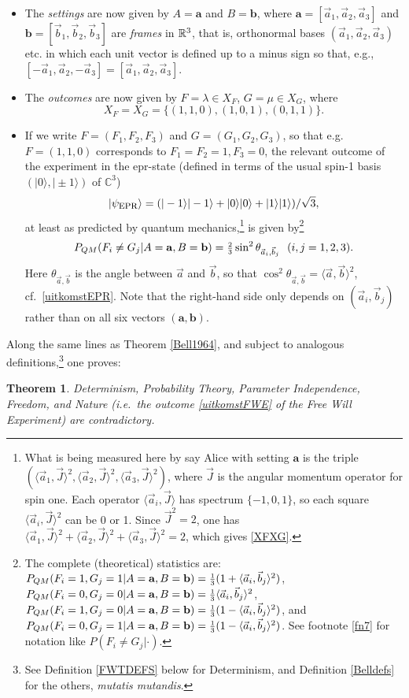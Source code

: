 \documentclass[11pt]{article}
\newtheorem{Theorem}[Definition]{Theorem}
\newcommand{\epr}{{\sc epr}}
\newcommand{\tthird}{\mbox{\footnotesize $\frac{2}{3}$}}
\newcommand{\third}{\mbox{\footnotesize $\frac{1}{3}$}}
\newcommand{\beq}{\begin{equation}}
\newcommand{\eeq}{\end{equation}}
\newcommand{\qm}{quantum mechanics}
\newcommand{\la}{\langle} \newcommand{\ra}{\rangle}
\newcommand{\er}{\eqref}
\newcommand{\lm}{\lambda} \newcommand{\Lm}{\Lambda}
\newcommand{\C}{{\mathbb C}} \newcommand{\D}{{\mathbb D}}
\newcommand{\ba}{\mathbf{a}}\newcommand{\bb}{\mathbf{b}}
\begin{document}
\begin{itemize}
\item The \emph{settings} are now given by $A=\ba$ and $B=\bb$, where
$\ba=[\vec{a}_1,\vec{a}_2,\vec{a}_3]$ and  $\bb=[\vec{b}_1,\vec{b}_2,\vec{b}_3]$
 are \emph{frames} in ${\mathbb R}^3$, that is, orthonormal bases $(\vec{a}_1,\vec{a}_2,\vec{a}_3)$ etc. in which each unit vector is defined up to a minus sign so that, e.g., $[-\vec{a}_1,\vec{a}_2,-\vec{a}_3]=[\vec{a}_1,\vec{a}_2,\vec{a}_3]$.
\item The \emph{outcomes} are now given by $F=\lm\in X_F$, $G=\mu\in X_G$, where
\begin{equation}
X_F=X_G=\{(1,1,0), (1,0,1), (0,1,1)\}. \label{XFXG}
\end{equation}
\item If we write $F=(F_1,F_2,F_3)$ and $G=(G_1,G_2,G_3)$, so that e.g.\ $F=(1,1,0)$ corresponds to $F_1=F_2=1, F_3=0$, the relevant outcome of the experiment in the \epr-state (defined in terms of the usual spin-1 basis $(|0\ra,|\pm 1\ra)$ of $\C^3$)
\beq|\psi_{\mbox{\sc epr}}\ra=(|-1\ra|-1\ra+|0\ra|0\ra+|1\ra|1\ra)/\sqrt{3},\eeq
at least as predicted by \qm,\footnote{What is being measured here by say Alice with setting $\ba$ is the triple
$(\la\vec{a}_1,\vec{J}\ra^2,\la\vec{a}_2,\vec{J}\ra^2,\la\vec{a}_3,\vec{J}\ra^2)$, where $\vec{J}$ is the angular momentum operator for spin one. Each operator $\la\vec{a}_i,\vec{J}\ra$ has spectrum $\{-1, 0,1\}$, so  each square $\la\vec{a}_i,\vec{J}\ra^2$ can be 0 or 1. Since $\vec{J}^2=2$, one has
$\la\vec{a}_1,\vec{J}\ra^2+\la\vec{a}_2,\vec{J}\ra^2+\la\vec{a}_3,\vec{J}\ra^2=2$, which gives \er{XFXG}.
}  is given by\footnote{
The complete (theoretical) statistics  are:  $P_{QM}(F_i=1,G_j=1|A=\ba,B=\bb) =\third(1+\la\vec{a}_i,\vec{b}_j\ra^2)$,\\
$P_{QM}(F_i=0,G_j=0|A=\ba,B=\bb)= \third\la\vec{a}_i,\vec{b}_j\ra^2$, 
$P_{QM}(F_i=1,G_j=0|A=\ba,B=\bb)=  \third(1-\la\vec{a}_i,\vec{b}_j\ra^2)$, and 
$P_{QM}(F_i=0,G_j=1|A=\ba,B=\bb)= \third(1-\la\vec{a}_i,\vec{b}_j\ra^2)$. See footnote \ref{fn7} for  notation like $P(F_i\neq G_j|\cdot)$.
}
\begin{equation}
P_{QM}(F_i\neq G_j|A=\ba,B=\bb)=\tthird \sin^2\theta_{\vec{a}_i,\vec{b}_j} \:\:\: (i,j=1,2,3). \label{uitkomstFWE} 
\end{equation}
Here $\theta_{\vec{a},\vec{b}}$ is the angle between $\vec{a}$ and $\vec{b}$, so that $\cos^2 \theta_{\vec{a},\vec{b}}=\la\vec{a},\vec{b}\ra^2$, cf.\ \er{uitkomstEPR}.
Note that the right-hand side only depends on $(\vec{a}_i,\vec{b}_j)$ rather than on all six vectors $(\ba,\bb)$.
\end{itemize}
Along the same lines as Theorem \ref{Bell1964}, and subject to analogous definitions,\footnote{See Definition \ref{FWTDEFS} below for Determinism, and Definition \ref{Belldefs} for the others, \emph{mutatis mutandis}.} one  proves:
\begin{Theorem}\label{BellFWT}
Determinism, Probability Theory,  Parameter Independence, Freedom,  and Nature (i.e.\ the outcome \er{uitkomstFWE} of the Free Will Experiment) are contradictory.
\end{Theorem}
\end{document}
